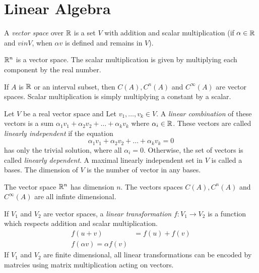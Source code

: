 \documentclass[fleqn,letterpaper]{report}
\begin{document}
\section{Linear Algebra}
\label{linear-algebra}

\begin{defn}
A \emph{vector space} over $\mathbb{R}$ is a set $V$ with addition
and scalar multiplication (if $\alpha \in \mathbb{R}$ and $v in V$,
when $\alpha v$ is defined and remains in $V$).
\end{defn}

\begin{example}
$\mathbb{R}^n$ is a vector space. The scalar multiplication is given
by multiplying each component by the real number. 
\end{example}

\begin{example}
If $A$ is $\mathbb{R}$ or an interval subset, then $C(A), C^n(A)$ and
$C^\infty(A)$ are vector spaces. Scalar multiplication is
simply multiplying a constant by a scalar. 
\end{example}

\begin{defn}
Let $V$ be a real vector space and Let $v_1, \ldots, v_k \in
V$.  A \emph{linear combination} of these vectors is a sum
$\alpha_1v_1 + \alpha_2v_2 + \ldots + \alpha_kv_k$ where
$\alpha_i \in \mathbb{R}$.  These vectors are called \emph{linearly
independent} if the equation
\begin{equation*}
\alpha_1 v_1 + \alpha_2 v_2 + \ldots + \alpha_k v_k = 0
\end{equation*}
has only the trivial solution, where all $\alpha_i =0$.
Otherwise, the set of vectors is called \emph{linearly
dependent}. A maximal linearly independent set in $V$ is
called a bases. The dimension of $V$ is the number of vector
in any bases.
\end{defn}

\begin{example}
The vector space $\mathbb{R}^n$ has dimension $n$. The vectors spaces
$C(A), C^n(A)$ and $C^\infty(A)$ are all infinte dimensional. 
\end{example}

\begin{defn}
If $V_1$ and $V_2$ are vector spaces, a \emph{linear
transformation} $f:V_1 \rightarrow V_2$ is a function which
respects addition and scalar multiplication.
\begin{align*}
f(u+v) & = f(u) + f(v) \\
f(\alpha v) = \alpha f(v)
\end{align*}
If $V_1$ and $V_2$ are finite dimensional, all linear
transformations can be encoded by matrcies using matrix
multiplication acting on vectors. 
\end{defn}
\end{document}
